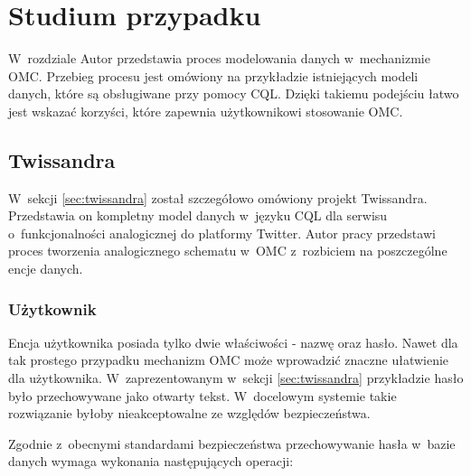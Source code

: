 
\chapter{Studium przypadku}
\label{chap:case_study}

W~rozdziale Autor przedstawia proces modelowania danych w~mechanizmie OMC. Przebieg procesu jest omówiony na przykładzie istniejących modeli danych, które są obsługiwane przy pomocy CQL. Dzięki takiemu podejściu łatwo jest wskazać korzyści, które zapewnia użytkownikowi stosowanie OMC.

\section{Twissandra}
\label{sec:case_study_twissandra}

W~sekcji \ref{sec:twissandra} został szczegółowo omówiony projekt Twissandra. Przedstawia on kompletny model danych w~języku CQL dla serwisu o~funkcjonalności analogicznej do platformy Twitter. Autor pracy przedstawi proces tworzenia analogicznego schematu w~OMC z~rozbiciem na poszczególne encje danych.

\subsection{Użytkownik}

Encja użytkownika posiada tylko dwie właściwości - nazwę oraz hasło. Nawet dla tak prostego przypadku mechanizm OMC może wprowadzić znaczne ułatwienie dla użytkownika. W~zaprezentowanym w~sekcji \ref{sec:twissandra} przykładzie hasło było przechowywane jako otwarty tekst. W~docelowym systemie takie rozwiązanie byłoby nieakceptowalne ze względów bezpieczeństwa. 

Zgodnie z~obecnymi standardami bezpieczeństwa przechowywanie hasła w~bazie danych wymaga wykonania następujących operacji:~\cite{how_to_store_users_password_safely}


